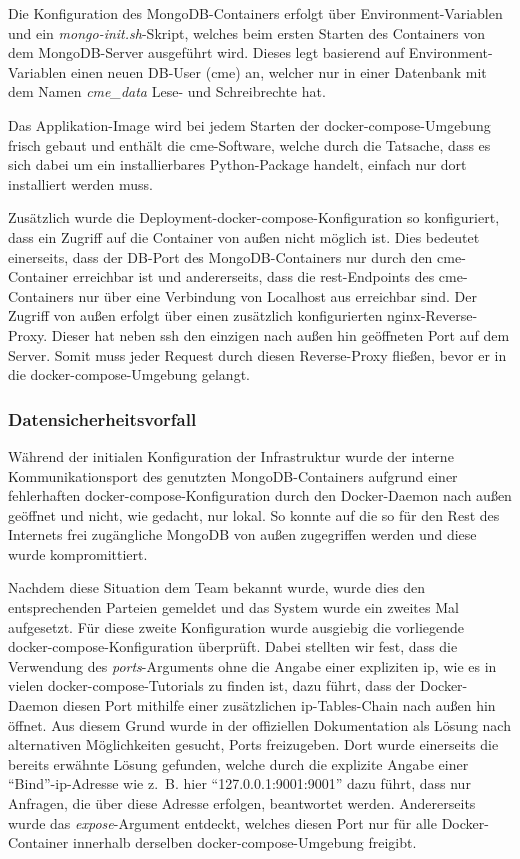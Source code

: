 Die Konfiguration des MongoDB-Containers erfolgt über Environment-Variablen
und ein \textit{mongo-init.sh}-Skript, welches beim ersten Starten des
Containers von dem MongoDB-Server ausgeführt wird. Dieses legt basierend auf
Environment-Variablen einen neuen DB-User (cme) an, welcher nur in einer
Datenbank mit dem Namen \textit{cme\_data} Lese- und Schreibrechte hat.

Das Applikation-Image wird bei jedem Starten der docker-compose-Umgebung
frisch gebaut und enthält die \gls{cme}-Software, welche durch die Tatsache,
dass es sich dabei um ein installierbares Python-Package handelt, einfach nur
dort installiert werden muss.

Zusätzlich wurde die Deployment-docker-compose-Konfiguration so konfiguriert,
dass ein Zugriff auf die Container von außen nicht möglich ist. Dies bedeutet
einerseits, dass der DB-Port des MongoDB-Containers nur durch den
\gls{cme}-Container erreichbar ist und andererseits, dass die
\gls{rest}-Endpoints des \gls{cme}-Containers nur über eine Verbindung von
Localhost aus erreichbar sind. Der Zugriff von außen erfolgt über einen
zusätzlich konfigurierten nginx-Reverse-Proxy. Dieser hat neben \gls{ssh} den
einzigen nach außen hin geöffneten Port auf dem Server. Somit muss jeder
Request durch diesen Reverse-Proxy fließen, bevor er in die
docker-compose-Umgebung gelangt.

\subsubsection{Datensicherheitsvorfall}

Während der initialen Konfiguration der Infrastruktur wurde der interne
Kommunikationsport des genutzten MongoDB-Containers aufgrund einer
fehlerhaften docker-compose-Konfiguration durch den Docker-Daemon nach außen
geöffnet und nicht, wie gedacht, nur lokal. So konnte auf die so für den Rest
des Internets frei zugängliche MongoDB von außen zugegriffen werden und diese
wurde kompromittiert.

Nachdem diese Situation dem Team bekannt wurde, wurde dies den entsprechenden
Parteien gemeldet und das System wurde ein zweites Mal aufgesetzt. Für diese
zweite Konfiguration wurde ausgiebig die vorliegende
docker-compose-Konfiguration überprüft. Dabei stellten wir fest, dass die
Verwendung des \textit{ports}-Arguments ohne die Angabe einer expliziten \gls{ip},
wie es in vielen docker-compose-Tutorials zu finden ist, dazu führt, dass der
Docker-Daemon diesen Port mithilfe einer zusätzlichen \gls{ip}-Tables-Chain nach
außen hin öffnet. Aus diesem Grund wurde in der offiziellen Dokumentation als
Lösung nach alternativen Möglichkeiten gesucht, Ports freizugeben. Dort wurde
einerseits die bereits erwähnte Lösung gefunden, welche durch die explizite
Angabe einer \enquote{Bind}-\gls{ip}-Adresse wie z.~B. hier
\enquote{127.0.0.1:9001:9001} dazu führt, dass nur Anfragen, die über diese
Adresse erfolgen, beantwortet werden. Andererseits wurde das
\textit{expose}-Argument entdeckt, welches diesen Port nur für alle
Docker-Container innerhalb derselben docker-compose-Umgebung freigibt.

